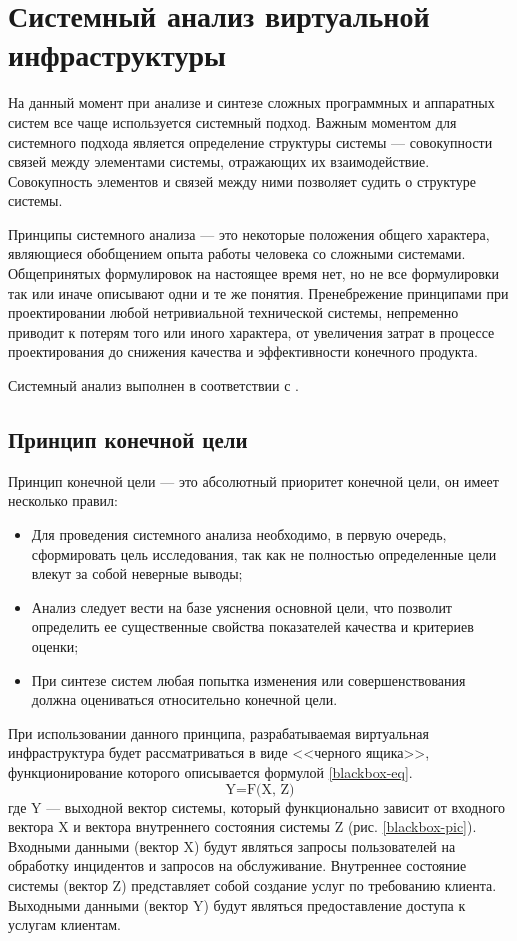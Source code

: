\section{Системный анализ виртуальной инфраструктуры}

На данный момент при анализе и синтезе сложных программных и аппаратных систем все чаще используется системный подход.
Важным моментом для системного подхода является определение структуры системы --- совокупности связей между элементами системы, отражающих их взаимодействие.
Совокупность элементов и связей между ними позволяет судить о структуре системы.

Принципы системного анализа --- это некоторые положения общего характера, являющиеся обобщением опыта работы человека со сложными системами.
Общепринятых формулировок на настоящее время нет, но не все формулировки так или иначе описывают одни и те же понятия.
Пренебрежение принципами при проектировании любой нетривиальной технической системы, непременно приводит к потерям того или иного характера, от увеличения затрат в процессе проектирования до снижения качества и эффективности конечного продукта.

Системный анализ выполнен в соответствии с \cite{sys-analyz}.

\subsection{Принцип конечной цели}

Принцип конечной цели --- это абсолютный приоритет конечной цели, он имеет несколько правил:
\begin{itemize}
  \item Для проведения системного анализа необходимо, в первую очередь, сформировать цель исследования, так как не полностью определенные цели влекут за собой неверные выводы;
  \item Анализ следует вести на базе уяснения основной цели, что позволит определить ее существенные свойства показателей качества и критериев оценки;
  \item При синтезе систем любая попытка изменения или совершенствования должна оцениваться относительно конечной цели.
\end{itemize}

При использовании данного принципа, разрабатываемая виртуальная инфраструктура будет рассматриваться в виде <<черного ящика>>, функционирование которого описывается формулой \ref{blackbox-eq}.
\begin{equation} \label{blackbox-eq}
\text{Y=F(X, Z)}
\end{equation}
где Y --- выходной вектор системы, который функционально зависит от входного вектора X и вектора внутреннего состояния системы Z (рис. \ref{blackbox-pic}).
Входными данными (вектор X) будут являться запросы пользователей на обработку инцидентов и запросов на обслуживание.
Внутреннее состояние системы (вектор Z) представляет собой создание услуг по требованию клиента.
Выходными данными (вектор Y) будут являться предоставление доступа к услугам клиентам.

